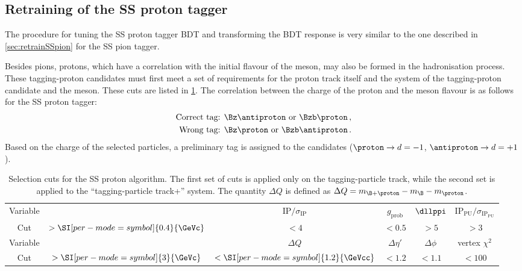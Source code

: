 \subsection{Retraining of the SS proton tagger}
\label{sec:retrainSSproton}

The procedure for tuning the SS proton tagger BDT and transforming the BDT response is very similar to the one described in \cref{sec:retrainSSpion} for the SS pion tagger.

Besides pions, protons, which have a correlation with the initial flavour of the \B meson, may also be formed in the hadronisation process.
These tagging-proton candidates must first meet a set of requirements for the proton track itself and the system of the tagging-proton candidate and the \B meson.
These cuts are listed in \cref{tab:selectionSSProton}.
The correlation between the charge of the proton and the \B meson flavour is as follows for the SS proton tagger:
\begin{align*}
	\text{Correct tag: }& \Bz\antiproton \text{ or } \Bzb\proton\,,\\
	\text{Wrong tag: }& \Bz\proton \text{ or } \Bzb\antiproton\,.
\end{align*}
Based on the charge of the selected particles, a preliminary tag is assigned to the \B candidates ($\proton\rightarrow  d=-1$, $\antiproton\rightarrow d=+1$).
\begin{table}[bp]
	\centering
	\caption{Selection cuts for the SS proton algorithm.
	The first set of cuts is applied only on the tagging-particle track, while the second set is applied to the \enquote{tagging-particle track+\B} system.
	The quantity $\Delta Q$ is defined as $\Delta Q=m_{\B+\proton}-m_{\B}-m_{\proton}$.}
	\begin{tabular}{cccccc}
		\toprule
		Variable & \pt & $\text{IP}/\sigma_\text{IP}$ & $g_\text{prob}$ & $\dllppi$ & $\text{IP}_\text{PU}/\sigma_{\text{IP}_\text{PU}}$ \\
		Cut & $>\SI[per-mode=symbol]{0.4}{\GeVc}$ & $<4$ & $<0.5$ & $>5$ & $>3$ \\
		\midrule
		Variable & \pt & $\Delta Q$ & $\Delta\eta'$ & $\Delta\phi$  & vertex $\chi^2$ \\
		Cut & $>\SI[per-mode=symbol]{3}{\GeVc}$ & $<\SI[per-mode=symbol]{1.2}{\GeVcc}$ & $<1.2$ & $<1.1$ & $<100$ \\
		\bottomrule
	\end{tabular}
	\label{tab:selectionSSProton}
\end{table}

